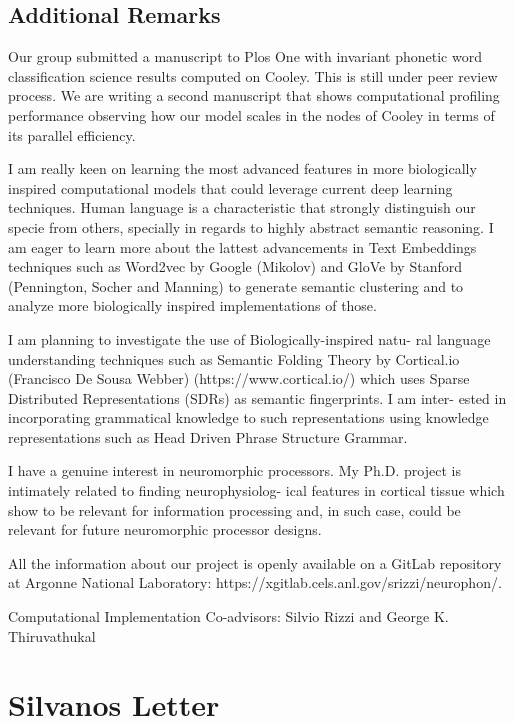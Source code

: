 \documentclass{article}
\begin{document}
\subsection*{Additional Remarks}

Our group submitted a manuscript to Plos One with invariant phonetic word classification science results computed
on Cooley. This is still under peer review process. We are writing a second manuscript that shows computational
profiling performance observing how our model scales in the nodes of Cooley in terms of its parallel efficiency.

I am really keen on learning the most advanced
features in more biologically inspired computational models that could leverage current deep learning techniques.
Human language is a characteristic that strongly distinguish our specie from others, specially in regards to highly
abstract semantic reasoning. I am eager to learn more about the lattest advancements in Text Embeddings techniques
such as Word2vec by Google (Mikolov) and GloVe by Stanford (Pennington, Socher and Manning) to generate semantic
clustering and to analyze more biologically inspired implementations of those.

I am planning to investigate the use of Biologically-inspired natu-
ral language understanding techniques such as Semantic Folding Theory by Cortical.io (Francisco De Sousa Webber)
(https://www.cortical.io/) which uses Sparse Distributed Representations (SDRs) as semantic fingerprints. I am inter-
ested in incorporating grammatical knowledge to such representations using knowledge representations such as Head
Driven Phrase Structure Grammar.

I have a genuine interest in neuromorphic processors. My Ph.D. project is intimately related to finding neurophysiolog-
ical features in cortical tissue which show to be relevant for information processing and, in such case, could be relevant
for future neuromorphic processor designs.

All the information about our project is openly available on a GitLab repository at Argonne National Laboratory:
https://xgitlab.cels.anl.gov/srizzi/neurophon/.

Computational Implementation Co-advisors: Silvio Rizzi and George K. Thiruvathukal




\section*{Silvanos Letter}
\end{document}
